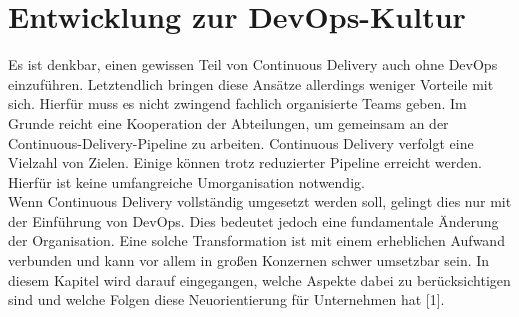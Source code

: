 \section{Entwicklung zur DevOps-Kultur} \label{entwicklung}
Es ist denkbar, einen gewissen Teil von Continuous Delivery auch ohne DevOps einzuführen. Letztendlich bringen diese Ansätze allerdings weniger Vorteile mit sich. Hierfür muss es nicht zwingend fachlich organisierte Teams geben. Im Grunde reicht eine Kooperation der Abteilungen, um gemeinsam an der Continuous-Delivery-Pipeline zu arbeiten. Continuous Delivery verfolgt eine Vielzahl von Zielen. Einige können trotz reduzierter Pipeline erreicht werden. Hierfür ist keine umfangreiche Umorganisation notwendig.\\ Wenn Continuous Delivery vollständig umgesetzt werden soll, gelingt dies nur mit der Einführung von DevOps. Dies bedeutet jedoch eine fundamentale Änderung der Organisation. Eine solche Transformation ist mit einem erheblichen Aufwand verbunden und kann vor allem in großen Konzernen schwer umsetzbar sein. In diesem Kapitel wird darauf eingegangen, welche Aspekte dabei zu berücksichtigen sind und welche Folgen diese Neuorientierung für Unternehmen hat [1].

